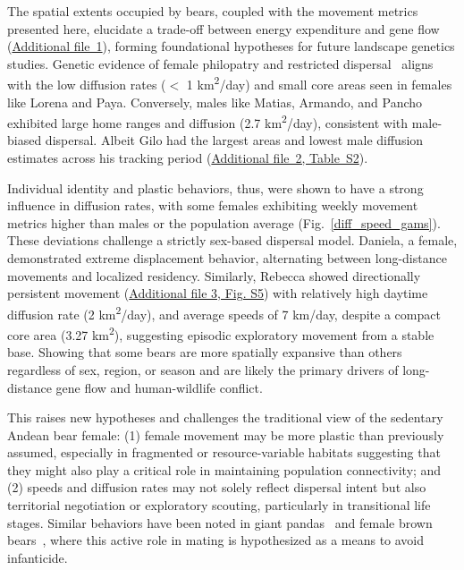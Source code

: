 \documentclass[lineno,referee,pdflatex,sn-vancouver-num]{sn-jnl}%
\theoremstyle{thmstyleone}%
\theoremstyle{thmstyletwo}%
\theoremstyle{thmstylethree}%
\begin{document}
The spatial extents occupied by bears, coupled with the movement metrics presented here, elucidate a trade-off between energy expenditure and gene flow (\hyperref[S1_File]{Additional file~1}), forming foundational hypotheses for future landscape genetics studies.
Genetic evidence of female philopatry and restricted dispersal~\cite{cuevaEvidencePopulationGenetic2024} aligns with the low diffusion rates ($<$ 1 km\textsuperscript2/day) and small core areas seen in females like Lorena and Paya. Conversely, males like Matias, Armando, and Pancho exhibited large home ranges and diffusion (2.7 km\textsuperscript{2}/day), consistent with male-biased dispersal. Albeit Gilo had the largest areas and lowest male diffusion estimates across his tracking period (\hyperref[S2_File]{Additional file~2, Table~S2}).

Individual identity and plastic behaviors, thus, were shown to have a strong influence in diffusion rates, with some females exhibiting weekly movement metrics higher than males or the population average (Fig.~\ref{diff_speed_gams}). These deviations challenge a strictly sex-based dispersal model. Daniela, a female, demonstrated extreme displacement behavior, alternating between long-distance movements and localized residency. Similarly, Rebecca showed directionally persistent movement (\hyperref[S3_File]{Additional file 3, Fig. S5}) with relatively high daytime
diffusion rate (2 km\textsuperscript{2}/day), and average speeds of 7 km/day,
despite a compact core area (3.27 km\textsuperscript{2}), suggesting episodic exploratory
movement from a stable base. Showing that some bears are more spatially expansive than others regardless of sex, region, or season and are likely the primary drivers of long-distance gene flow and human-wildlife conflict.

This raises new hypotheses and challenges the traditional view of the sedentary Andean bear female: (1) female movement may be more plastic than previously
assumed, especially in fragmented or resource-variable habitats suggesting that they might also play a critical role in maintaining population connectivity; and (2) speeds
and diffusion rates may not solely reflect dispersal intent but also territorial
negotiation or exploratory scouting, particularly in transitional life stages. Similar behaviors have been noted in giant pandas~\cite{connorTelemetryResearchElusive2016} and female brown bears~\cite{penterianiMatingFemalePerspective2025}, where this active role in mating is hypothesized as a means to avoid infanticide.
\end{document}
